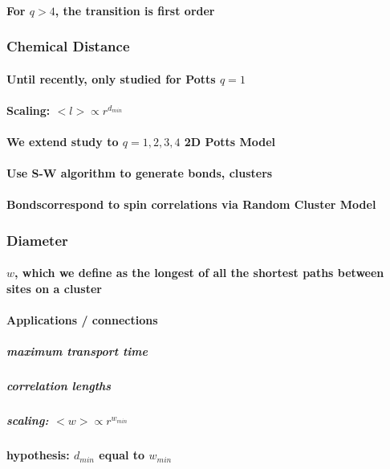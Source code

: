 \documentclass[pre,preprint]{revtex4-1}
\begin{document}
\paragraph{For $q>4$, the transition is first order \cite{Bax}}
\label{sec-1.1.1.7}
\subsubsection{Chemical Distance}
\label{sec-1.1.2}
\paragraph{Until recently, only studied for Potts $q=1$}
\label{sec-1.1.2.1}
\paragraph{Scaling: $< l > \propto r^{d_{min}}$}
\label{sec-1.1.2.2}
\paragraph{We extend study to $q=1,2,3,4$ 2D Potts Model}
\label{sec-1.1.2.3}
\paragraph{Use S-W algorithm to generate bonds, clusters}
\label{sec-1.1.2.4}
\paragraph{Bondscorrespond to spin correlations via Random Cluster Model}
\label{sec-1.1.2.5}
\subsubsection{Diameter}
\label{sec-1.1.3}
\paragraph{$w$, which we define as the longest of all the shortest paths between sites on a cluster}
\label{sec-1.1.3.1}
\paragraph{Applications / connections}
\label{sec-1.1.3.2}
\subparagraph{maximum transport time}
\label{sec-1.1.3.2.1}
\subparagraph{correlation lengths}
\label{sec-1.1.3.2.2}
\subparagraph{scaling: $< w > \propto r^{w_{min}}$}
\label{sec-1.1.3.2.3}
\paragraph{hypothesis: $d_{min}$ equal to $w_{min}$}
\label{sec-1.1.3.3}
\end{document}
